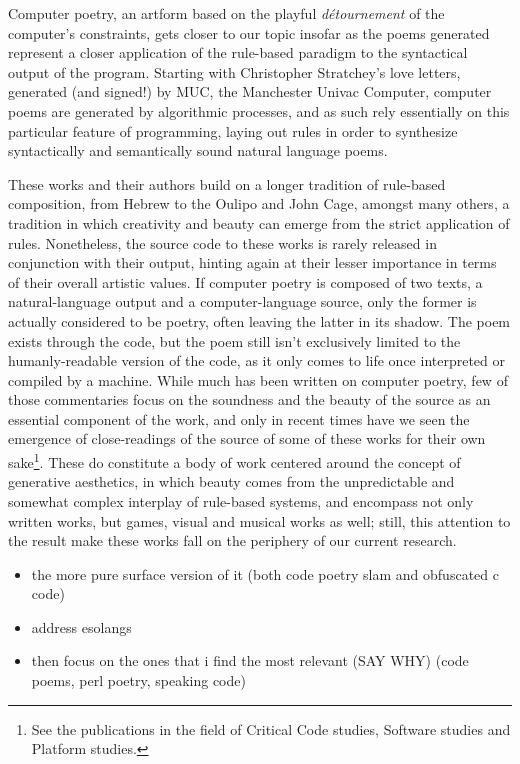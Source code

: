 \documentclass{article}
\begin{document}
Computer poetry, an artform based on the playful \emph{détournement} of the computer's constraints, gets closer to our topic insofar as the poems generated represent a closer application of the rule-based paradigm to the syntactical output of the program. Starting with Christopher Stratchey's love letters, generated (and signed!) by MUC, the Manchester Univac Computer, computer poems are generated by algorithmic processes, and as such rely essentially on this particular feature of programming, laying out rules in order to synthesize syntactically and semantically sound natural language poems.

These works and their authors build on a longer tradition of rule-based composition, from Hebrew to the Oulipo and John Cage, amongst many others\cite{cramer_words_2003}, a tradition in which creativity and beauty can emerge from the strict application of rules. Nonetheless, the source code to these works is rarely released in conjunction with their output, hinting again at their lesser importance in terms of their overall artistic values. If computer poetry is composed of two texts, a natural-language output and a computer-language source, only the former is actually considered to be poetry, often leaving the latter in its shadow. The poem exists through the code, but the poem still isn't exclusively limited to the humanly-readable version of the code, as it only comes to life once interpreted or compiled by a machine. While much has been written on computer poetry, few of those commentaries focus on the soundness and the beauty of the source as an essential component of the work, and only in recent times have we seen the emergence of close-readings of the source of some of these works for their own sake\footnote{See the publications in the field of Critical Code studies, Software studies and Platform studies.}. These do constitute a body of work centered around the concept of generative aesthetics\cite{goriunova_read_2005}, in which beauty comes from the unpredictable and somewhat complex interplay of rule-based systems, and encompass not only written works, but games, visual and musical works as well; still, this attention to the result make these works fall on the periphery of our current research.

\begin{itemize}
    \item the more pure surface version of it (both code poetry slam and obfuscated c code)
    \item address esolangs
    \item then focus on the ones that i find the most relevant (SAY WHY) (code poems, perl poetry, speaking code\cite{cox_speaking_2013})
\end{itemize}
\end{document}
